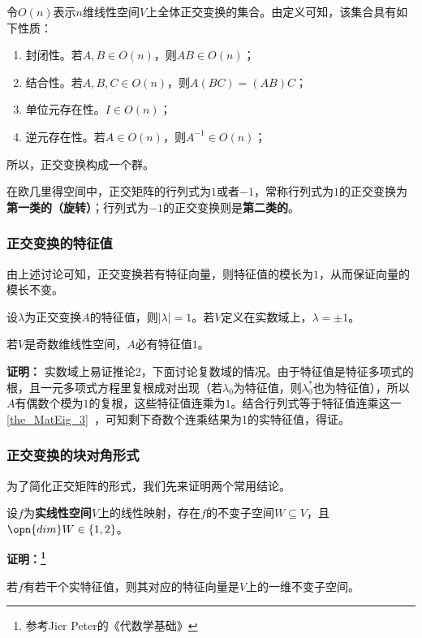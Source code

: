 令$O(n)$表示$n$维线性空间$V$上全体正交变换的集合。由定义可知，该集合具有如下性质：
\begin{enumerate}
\item 封闭性。若$A,B\in O(n)$，则$AB\in O(n)$；
\item 结合性。若$A,B,C\in O(n)$，则$A(BC)=(AB)C$；
\item 单位元存在性。$I\in O(n)$；
\item 逆元存在性。若$A\in O(n)$，则$A^{-1}\in O(n)$；
\end{enumerate}
所以，正交变换构成一个群。

在欧几里得空间中，正交矩阵的行列式为$1$或者$-1$，常称行列式为$1$的正交变换为\textbf{第一类的（旋转）}；行列式为$-1$的正交变换则是\textbf{第二类的}。
\subsubsection{正交变换的特征值}
由上述讨论可知，正交变换若有特征向量，则特征值的模长为$1$，从而保证向量的模长不变。
\begin{corollary}{}
 设$\lambda$为正交变换$A$的特征值，则$|\lambda|=1$。若$V$定义在实数域上，$\lambda=\pm 1$。
\end{corollary}
\begin{corollary}{}
若$V$是奇数维线性空间，$A$必有特征值$1$。
\end{corollary}
\textbf{证明：}
实数域上易证推论2，下面讨论复数域的情况。由于特征值是特征多项式的根，且一元多项式方程里复根成对出现（若$\lambda_0$为特征值，则$\lambda_0^{*}$也为特征值），所以$A$有偶数个模为$1$的复根，这些特征值连乘为$1$。结合行列式等于特征值连乘这一\autoref{the_MatEig_3}~，可知剩下奇数个连乘结果为1的实特征值，得证。
\subsubsection{正交变换的块对角形式}
为了简化正交矩阵的形式，我们先来证明两个常用结论。
\begin{lemma}{}\label{lem_ortho_1}
设$f$为\textbf{实线性空间}$V$上的线性映射，存在$f$的不变子空间$W\subseteq V$，且$\opn{dim}W\in\{1,2\}$。
\end{lemma}
\textbf{证明：\footnote{参考Jier Peter的《代数学基础》}}

若$f$有若干个实特征值，则其对应的特征向量是$V$上的一维不变子空间。

